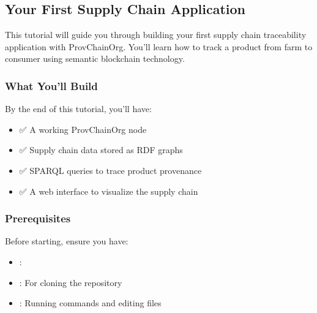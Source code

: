 \documentclass[letterpaper,10pt,english]{sphinxmanual}
\begin{document}
\sphinxstepscope


\subsection{Your First Supply Chain Application}
\label{\detokenize{tutorials/first-supply-chain:your-first-supply-chain-application}}\label{\detokenize{tutorials/first-supply-chain::doc}}
\sphinxAtStartPar
This tutorial will guide you through building your first supply chain traceability application with ProvChainOrg. You’ll learn how to track a product from farm to consumer using semantic blockchain technology.


\subsubsection{What You’ll Build}
\label{\detokenize{tutorials/first-supply-chain:what-you-ll-build}}
\sphinxAtStartPar
By the end of this tutorial, you’ll have:
\begin{itemize}
\item {} 
\sphinxAtStartPar
✅ A working ProvChainOrg node

\item {} 
\sphinxAtStartPar
✅ Supply chain data stored as RDF graphs

\item {} 
\sphinxAtStartPar
✅ SPARQL queries to trace product provenance

\item {} 
\sphinxAtStartPar
✅ A web interface to visualize the supply chain

\end{itemize}


\subsubsection{Prerequisites}
\label{\detokenize{tutorials/first-supply-chain:prerequisites}}
\sphinxAtStartPar
Before starting, ensure you have:
\begin{itemize}
\item {} 
\sphinxAtStartPar
{}: 

\item {} 
\sphinxAtStartPar
{}: For cloning the repository

\item {} 
\sphinxAtStartPar
{}: Running commands and editing files

\end{itemize}
\end{document}
